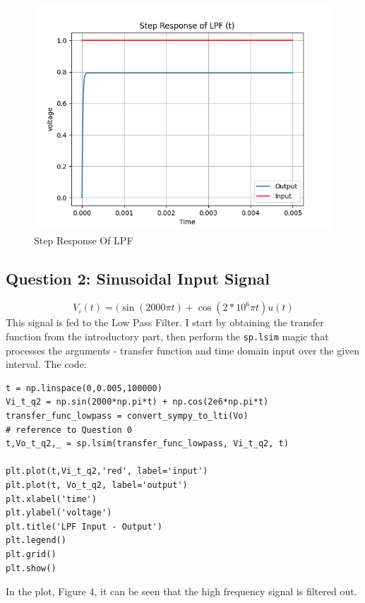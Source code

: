 \documentclass[11pt, a4paper]{article}
\begin{document}
  \begin{figure}[!tbh]
   	\centering
  \includegraphics[scale=0.5]{q1.png} 
    \caption{Step Response Of LPF} 	
   \end{figure} 

\subsection{Question 2: Sinusoidal Input Signal}
$$V_i(t)=(\sin(2000\pi t)+\cos(2*10^6\pi t)u(t)$$
This signal is fed to the Low Pass Filter. I start by obtaining the transfer function from the introductory part, then perform the \texttt{sp.lsim} magic that processes the arguments - transfer function  and time domain input over the given interval. The code:
\begin{verbatim}
t = np.linspace(0,0.005,100000)
Vi_t_q2 = np.sin(2000*np.pi*t) + np.cos(2e6*np.pi*t)
transfer_func_lowpass = convert_sympy_to_lti(Vo)  
# reference to Question 0
t,Vo_t_q2,_ = sp.lsim(transfer_func_lowpass, Vi_t_q2, t)

plt.plot(t,Vi_t_q2,'red', label='input')
plt.plot(t, Vo_t_q2, label='output')
plt.xlabel('time')
plt.ylabel('voltage')
plt.title('LPF Input - Output')
plt.legend()
plt.grid()
plt.show()
\end{verbatim}

In the plot, Figure 4, it can be seen that the high frequency signal is filtered out. 
\end{document}
